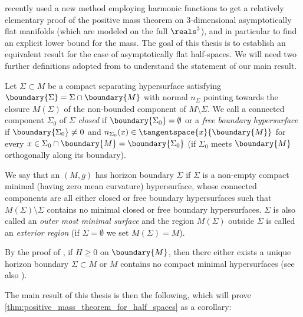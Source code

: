 \documentclass[titlepage,numbers=noenddot,oneside,%
cleardoublepage=empty,paper=a4,fontsize=11pt,%
english,%
]{scrartcl}
\begin{document}
\Textcite{brayHarmonicFunctionsMass2019} recently used a new method employing harmonic functions to get a relatively elementary proof of the positive mass theorem on 3-dimensional asymptotically flat manifolds (which are modeled on the full \( \reals^3 \)),  and in particular to find an explicit lower bound for the mass. The goal of this thesis is to establish an equivalent result for the case of asymptotically flat half-spaces. We will need two further definitions adopted from \cite{eichmairDoublingAsymptoticallyFlat2023} to understand the statement of our main result.
\begin{definition}
    Let \( \Sigma\subset M  \) be a compact separating hypersurface satisfying \( \boundary{\Sigma}={\Sigma\cap\boundary{M}} \) with normal \( n_\Sigma \) pointing towards the closure \( M(\Sigma) \) of the non-bounded component of \( M\setminus \Sigma \). We call a connected component \( \Sigma_0 \) of \( \Sigma \) \emph{closed} if \( \boundary{\Sigma_0}=\emptyset \) or a \emph{free boundary hypersurface} if \( \boundary{\Sigma_0}\neq 0 \) and \( n_{\Sigma_0}(x)\in \tangentspace{x}{\boundary{M}} \) for every \( x\in \Sigma_0\cap \boundary{M}=\boundary{\Sigma_0} \) (\ie if \( \Sigma_0 \) meets \( \boundary{M} \) orthogonally along its boundary).

    We say that an \( (M,g) \) has horizon boundary \( \Sigma \) if \( \Sigma \) is a non-empty compact minimal (\ie having zero mean curvature) hypersurface, whose connected components are all either closed or free boundary hypersurfaces such that \( M(\Sigma)\setminus \Sigma \) contains no minimal closed or free boundary hypersurfaces. \( \Sigma \) is also called an \emph{outer most minimal surface} and the region \( M(\Sigma) \) outside \( \Sigma \) is called an \emph{exterior region} (if \( \Sigma=\emptyset \) we set \( M(\Sigma)=M \)).
\end{definition}
\begin{remark}\label{rem:exterior_region_existence}
    By the proof of \cite[Lemma 2.3]{koerberRiemannianPenroseInequality2020}, if \( H\geq 0 \) on \( \boundary{M} \), then there either exists a unique horizon boundary \( \Sigma\subset M \) or \( M \) contains no compact minimal hypersurfaces (see also \cite[Remark 3]{eichmairDoublingAsymptoticallyFlat2023}).
\end{remark}
The main result of this thesis is then the following, which will prove \cref{thm:positive_mass_theorem_for_half_spaces} as a corollary:
\end{document}
